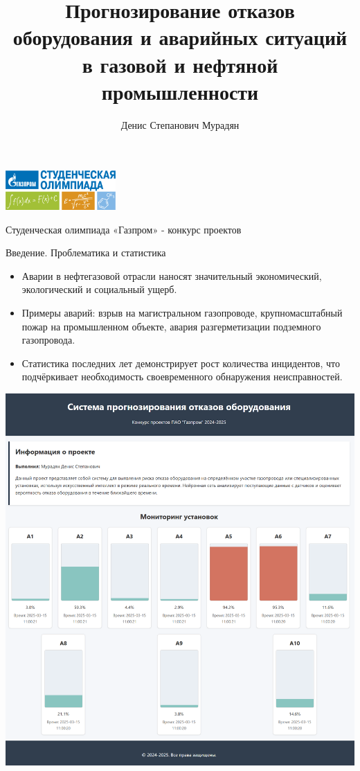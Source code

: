 \documentclass[aspectratio=169]{beamer}
\title{Прогнозирование отказов оборудования и аварийных ситуаций \\ в газовой и нефтяной промышленности}
\author{Денис Степанович Мурадян}
\date{\the\year}
\begin{document}
\begin{frame}[plain]
  \centering
  \includegraphics[height=1.5cm]{../../Include/logo.png}\par\vspace{0.5cm}
  {\LARGE \textbf{\inserttitle}\par}\vspace{1em}
  {\large \insertauthor\par}\vspace{1em}
  {\large \insertdate\par}\vspace{2em}
  {\small Студенческая олимпиада «Газпром» - конкурс проектов\par}
\end{frame}

\begin{frame}{Введение. Проблематика и статистика}
  \begin{itemize}
    \item Аварии в нефтегазовой отрасли наносят значительный экономический, экологический и социальный ущерб.
    \item Примеры аварий: взрыв на магистральном газопроводе, крупномасштабный пожар на промышленном объекте, авария разгерметизации подземного газопровода.
    \item Статистика последних лет демонстрирует рост количества инцидентов, что подчёркивает необходимость своевременного обнаружения неисправностей.
  \end{itemize}
  \vspace{0.5cm}
  \centering
  \includegraphics[width=0.6\linewidth]{../../Include/dashboard.png}
\end{frame}
\end{document}
